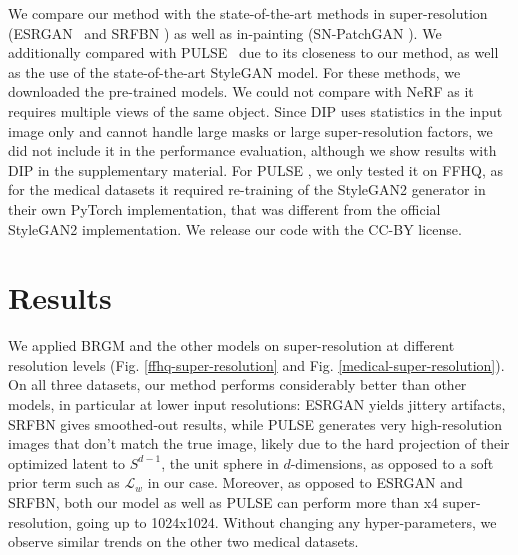 \documentclass{article}
\newcommand{\fld}{results}
\newcommand{\valid}{validation}
\newcommand{\pulse}{PULSE \cite{menon2020pulse}}
\newcommand{\esrgan}{ESRGAN \cite{wang2018esrgan}}
\newcommand{\srfbn}{SRFBN \cite{li2019feedback}}
\newcommand{\patchgan}{SN-PatchGAN \cite{yu2019free}}
\newcommand{\loss}{\mathcal{L}}
\begin{document}
We compare our method with the state-of-the-art methods in super-resolution (\esrgan\ and \srfbn) as well as in-painting (\patchgan). We additionally compared with \pulse\ due to its closeness to our method, as well as the use of the state-of-the-art StyleGAN model. For these methods, we downloaded the pre-trained models. We could not compare with NeRF \cite{mildenhall2020nerf} as it requires multiple views of the same object. Since DIP \cite{ulyanov2018deep} uses statistics in the input image only and cannot handle large masks or large super-resolution factors, we did not include it in the performance evaluation, although we show results with DIP in the supplementary material. For \pulse, we only tested it on FFHQ, as for the medical datasets it required re-training of the StyleGAN2 generator in their own PyTorch implementation, that was different from the official StyleGAN2 implementation. We release our code with the CC-BY license.

\section{Results}




We applied BRGM and the other models on super-resolution at different resolution levels (Fig. \ref{ffhq-super-resolution} and Fig. \ref{medical-super-resolution}). On all three datasets, our method performs considerably better than other models, in particular at lower input resolutions: ESRGAN yields jittery artifacts, SRFBN gives smoothed-out results, while PULSE generates very high-resolution images that don't match the true image, likely due to the hard projection of their optimized latent to $S^{d-1}$, the unit sphere in $d$-dimensions, as opposed to a soft prior term such as $\loss_w$ in our case. Moreover, as opposed to ESRGAN and SRFBN, both our model as well as PULSE can perform more than x4 super-resolution, going up to 1024x1024. Without changing any hyper-parameters, we observe similar trends on the other two medical datasets. 




\newcommand{\inFH}[1]{\fld/00636-recon-real-imagesffhq_test-inpaint-arbitrary/image#1-true} \newcommand{\inFM}[1]{masks/image#1-merged} \newcommand{\inFP}[1]{\valid/inpaint-sn-patchgan/output/ffhq/image#1} \newcommand{\inFD}[1]{validation/dip/output/ffhq_arbitrary/image#1_6000} \newcommand{\inFO}[1]{\fld/00636-recon-real-imagesffhq_test-inpaint-arbitrary/inpaint/image#1} 
\end{document}
